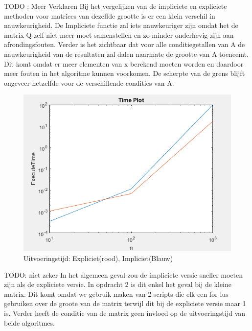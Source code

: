\documentclass{Numerieke}
\begin{document}
TODO : Meer Verklaren \newline
\newline
Bij het vergelijken van de impliciete en expliciete methoden voor matrices van dezelfde grootte is er een klein verschil in nauwkeurigheid. De Impliciete functie zal iets nauwkeuriger zijn omdat het de matrix Q zelf niet meer moet samenstellen en zo minder onderhevig zijn aan afrondingsfouten. Verder is het zichtbaar dat voor alle conditiegetallen van A de nauwkeurigheid van de resultaten zal dalen naarmate de grootte van A toeneemt. Dit komt omdat er meer elementen van x berekend moeten worden en daardoor meer fouten in het algoritme kunnen voorkomen. \newline
De scherpte van de grens blijft ongeveer hetzelfde voor de verschillende condities van A.  
\begin{figure}[H]
	\caption{Uitvoeringstijd: Expliciet(rood), Impliciet(Blauw) }
	\includegraphics[scale=0.6]{HouseholderTimePlot.png}
	\centering
\end{figure}
TODO: niet zeker \newline
\newline
In het algemeen geval zou de impliciete versie sneller moeten zijn als de expliciete versie. In opdracht 2 is dit enkel het geval bij de kleine matrix. Dit komt omdat we gebruik maken van 2 scripts die elk een for lus gebruiken over de groote van de matrix terwijl dit bij de expliciete versie maar 1 is. Verder heeft de conditie van de matrix geen invloed op de uitvoeringstijd van beide algoritmes. 
\end{document}
